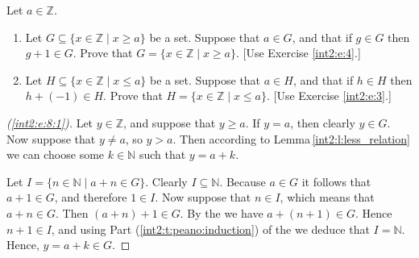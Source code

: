 \Newpage
\intiiLessRelL*

\begin{exercise} %
	\label{int2:e:8}
	Let $a \in \mathbb{Z}$.
	\begin{enumerate}
		\item \label{int2:e:8:1}
		      Let $G \subseteq \{ x \in \mathbb{Z} \mid x \geq a \}$ be a set. Suppose that $a \in G$, and that if $g \in G$ then $g + 1 \in G$. Prove that $G = \{ x \in \mathbb{Z} \mid x \geq a \}$.
		      \hfill [Use Exercise \ref{int2:e:4}.]
		\item \label{int2:e:8:2}
		      Let $H \subseteq \{x \in \mathbb{Z} \mid x \leq a \}$ be a set. Suppose that $a \in H$, and that if $h \in H$ then $h + (-1) \in H$. Prove that $H = \{ x \in \mathbb{Z} \mid x \leq a \}$.
		      \hfill [Use Exercise \ref{int2:e:3}.]
	\end{enumerate}

\end{exercise}

\begin{proof}[(\ref{int2:e:8:1})]
	Let $y \in \mathbb{Z}$, and suppose that $y \geq a$. If $y = a$, then clearly $y \in G$. Now suppose that $y \not= a$, so $y > a$. Then according to Lemma\,\ref{int2:l:less_relation} we can choose some $k \in \mathbb{N}$ such that $y = a + k$.

	Let $I = \{ n \in \mathbb{N} \mid a + n \in G \}$. Clearly $I \subseteq \mathbb{N}$. Because $a \in G$ it follows that $a + 1 \in G$, and therefore $1 \in I$. Now suppose that $n \in I$, which means that $a + n \in G$. Then $(a + n) + 1 \in G$. By the  we have $a + (n + 1) \in G$. Hence $n + 1 \in I$, and using Part (\ref{int2:t:peano:induction}) of the  we deduce that $I = \mathbb{N}$. Hence, $y = a + k \in G$.
\end{proof}

